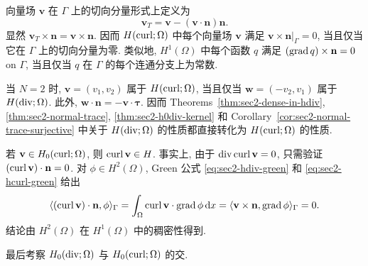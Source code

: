 \setcounter{statement}{2}
\begin{Remark}\label{rem:sec2-tangential-components}
向量场 $\mathbf v$ 在 $\Gamma$ 上的切向分量形式上定义为
\[
  \mathbf v_T=\mathbf v-(\mathbf v\cdot\mathbf n)\mathbf n.
\]
显然 $\mathbf v_T\times\mathbf n=\mathbf v\times\mathbf n$. 因而
$H(\operatorname{curl};\Omega)$ 中每个向量场 $\mathbf v$ 满足
$\mathbf v\times\mathbf n|_\Gamma=0$, 当且仅当它在 $\Gamma$ 上的切向分量为零.
类似地, $H^1(\Omega)$ 中每个函数 $q$ 满足
$(\operatorname{grad} q)\times\mathbf n=0$ on $\Gamma$, 当且仅当 $q$ 在 $\Gamma$ 的每个连通分支上为常数.
\end{Remark}

\setcounter{statement}{3}
\begin{Remark}\label{rem:sec2-hcurl-hdiv-2d}
当 $N=2$ 时, $\mathbf v=(v_1,v_2)$ 属于 $H(\operatorname{curl};\Omega)$, 当且仅当
$\mathbf w=(-v_2,v_1)$ 属于 $H(\operatorname{div};\Omega)$. 此外,
$\mathbf w\cdot\mathbf n=-\mathbf v\cdot\boldsymbol\tau$. 因而
Theorems~\ref{thm:sec2-dense-in-hdiv}, \ref{thm:sec2-normal-trace},
\ref{thm:sec2-h0div-kernel} 和 Corollary~\ref{cor:sec2-normal-trace-surjective}
中关于 $H(\operatorname{div};\Omega)$ 的性质都直接转化为 $H(\operatorname{curl};\Omega)$ 的性质.
\end{Remark}

\setcounter{statement}{4}
\begin{Remark}\label{rem:sec2-curl-in-h}
若 $\mathbf v\in H_0(\operatorname{curl};\Omega)$, 则 $\operatorname{curl}\mathbf v\in H$. 事实上,
由于 $\operatorname{div}\operatorname{curl}\mathbf v=0$, 只需验证
$(\operatorname{curl}\mathbf v)\cdot\mathbf n=0$. 对 $\phi\in H^2(\Omega)$,
Green 公式 \eqref{eq:sec2-hdiv-green} 和 \eqref{eq:sec2-hcurl-green} 给出
\[
  \langle(\operatorname{curl}\mathbf v)\cdot\mathbf n,\phi\rangle_\Gamma
  =\int_\Omega\operatorname{curl}\mathbf v\cdot\operatorname{grad}\phi\,\mathrm{d} x
  =\langle\mathbf v\times\mathbf n,\operatorname{grad}\phi\rangle_\Gamma=0.
\]
结论由 $H^2(\Omega)$ 在 $H^1(\Omega)$ 中的稠密性得到.
\end{Remark}

最后考察 $H_0(\operatorname{div};\Omega)$ 与 $H_0(\operatorname{curl};\Omega)$ 的交.

